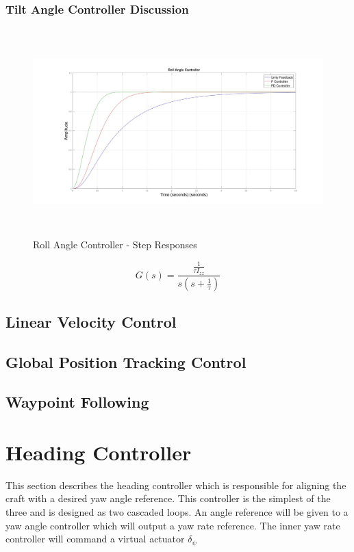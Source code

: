 		\subsubsection{Tilt Angle Controller Discussion}
		
		\begin{figure}[H]
			\centering
			\includegraphics[height = 8cm]{../Design/Matlab/Controllers/roll_angle_step.jpg}
			\caption{Roll Angle Controller -  Step Responses}
			\label{IM_RollAngleStep}
		\end{figure}
		
		\begin{equation}
		\label{EQ_RollAngleTF}
		G(s) = \frac{\frac{1}{\tau I_{zz}}}{s (s + \frac{1}{\tau})}
		\end{equation}
		
		
		\subsection{Linear Velocity Control}
		
		\subsection{Global Position Tracking Control}
		
		\subsection{Waypoint Following}
		
		\section{Heading Controller}
		This section describes the heading controller which is responsible for aligning the craft with a desired yaw angle reference. This controller is the simplest of the three and is designed as two cascaded loops. An angle reference will be given to a yaw angle controller which will output a yaw rate reference. The inner yaw rate controller will command a virtual actuator $\delta _{\psi}$
		
